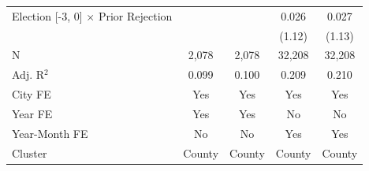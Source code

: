 \begin{tabular*}{\textwidth}{@{\extracolsep{\fill}}lcccc}
   Election [-3, 0] $\times$ Prior Rejection  &               &               & 0.026       & 0.027\\
                                              &               &               & (1.12)     & (1.13)\\
   \hline
   N                               & 2,078         & 2,078         & 32,208      & 32,208\\
   Adj. R$^2$                             & 0.099         & 0.100         & 0.209       & 0.210\\
   City FE                                    & Yes           & Yes           & Yes         & Yes\\
   Year FE                                    & Yes           & Yes           & No          & No\\
   Year-Month FE                              & No            & No            & Yes         & Yes\\
   Cluster              & County & County & County & County\\
   \bottomrule
\end{tabular*}
\par\endgroup
